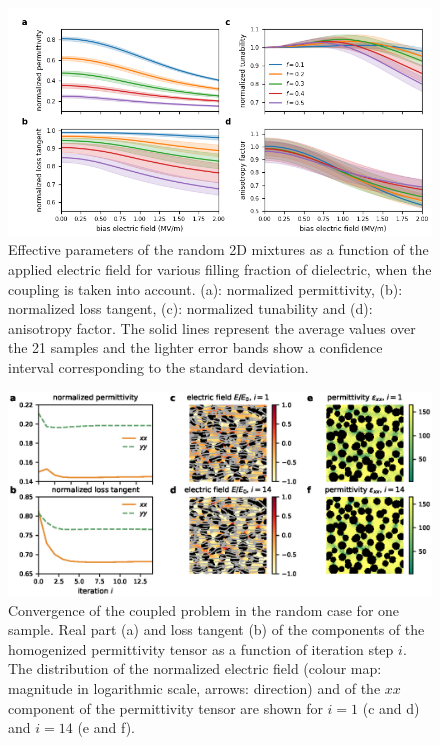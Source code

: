 \documentclass[openacc]{rsproca_new}%
\begin{document}
\begin{figure}[!t]
\centering
\includegraphics[width=1\textwidth]{effpar_rand_cpl}
\caption{Effective parameters of the random 2D mixtures as a function of the
 applied electric field for various filling fraction of dielectric, when the
 coupling is taken into account.
 (a): normalized permittivity, (b): normalized loss tangent, (c): normalized tunability and
 (d): anisotropy factor. The solid lines represent the average values
  over the 21 samples and the lighter error bands show a confidence interval corresponding to
  the standard deviation.}
\label{eff_par_2Drand_TM}
\end{figure}
%
%
%
\begin{figure}[!t]
\centering
\includegraphics[width=1\textwidth]{conv_rand}
\caption{Convergence of the coupled problem in the random case
for one sample.
Real part (a) and loss tangent (b) of the components of the homogenized
 permittivity tensor as a function of iteration step $i$. The distribution of
 the normalized electric field (colour map: magnitude in logarithmic scale, arrows: direction) and of the
 $xx$ component of the permittivity tensor are shown for $i=1$
  (c and d) and $i=14$ (e and f).
 }
\label{conv_random}
\end{figure}
\end{document}
